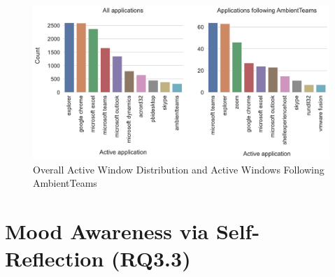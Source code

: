 \begin{figure}[h]
    \centering
    \includegraphics[width=.7\linewidth]{plots/active_windows.pdf}
    \caption{Overall Active Window Distribution and Active Windows Following AmbientTeams}
    \label{fig:active_windows}
\end{figure}









\section{Mood Awareness via Self-Reflection (RQ3.3)}
\label{section:mood_awareness_via_selfreflection}

